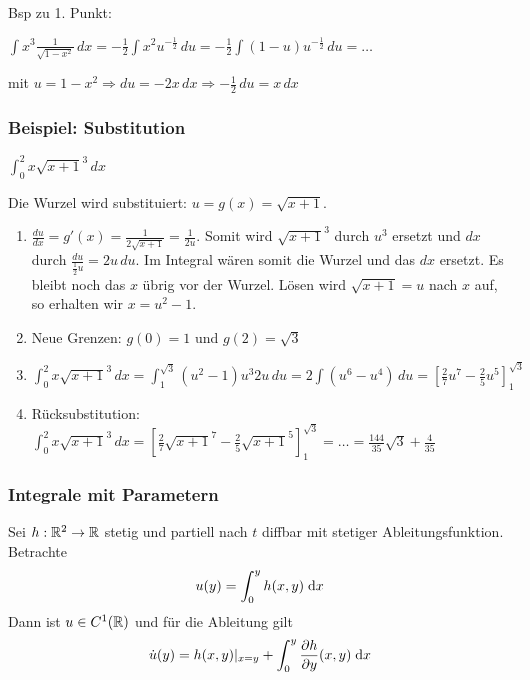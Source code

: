 Bsp zu 1. Punkt:

$\int x^3 \frac{1}{\sqrt{1-x^2}} \,dx = -\frac{1}{2} \int x^2 u^{-\frac{1}{2}} \,du 
= -\frac{1}{2} \int (1-u)u^{-\frac{1}{2}} \,du = \dots$

mit $u = 1-x^2 \Rightarrow du = -2x\,dx \Rightarrow -\frac{1}{2}\,du = x\,dx$

%

\subsubsection{Beispiel: Substitution}
$\int_0^2 x \sqrt{x+1}^3 \,dx$

Die Wurzel wird substituiert: $u = g(x) = \sqrt{x+1}$.

\begin{enumerate}[itemsep=0.5em]
	\item $\frac{du}{dx} = g'(x) = \frac{1}{2\sqrt{x+1}} = \frac{1}{2u}$. Somit
	wird $\sqrt{x+1}^3$ durch $u^3$ ersetzt und $dx$ durch
	$\frac{du}{\frac{1}{2}u} = 2u\,du$. Im Integral wären somit die Wurzel und das
	$dx$ ersetzt. Es bleibt noch das $x$ übrig vor der Wurzel. Lösen wird
	$\sqrt{x+1} = u$ nach $x$ auf, so erhalten wir $x = u^2 - 1$.
	\item Neue Grenzen: $g(0) = 1$ und $g(2) = \sqrt{3}$
	\item $\int_0^2 x \sqrt{x+1}^3 \,dx = \int_1^{\sqrt{3}} (u^2 - 1)u^3 2u \,du =
	2\int(u^6 -u^4) \,du = [\frac{2}{7}u^7 - \frac{2}{5}u^5]_{1}^{\sqrt{3}}$
	\item Rücksubstitution: $\int_0^2 x \sqrt{x+1}^3 \,dx =
	[\frac{2}{7}\sqrt{x+1}^7 - \frac{2}{5}\sqrt{x+1}^5]_{1}^{\sqrt{3}} = \ldots = \frac{144}{35}\sqrt{3} +
	\frac{4}{35}$
\end{enumerate}


\subsubsection{Integrale mit Parametern}
	Sei $h: \mathbb{R}^2 \to \mathbb{R}$ stetig und partiell nach $t$ diffbar mit stetiger Ableitungsfunktion. Betrachte 
	\[ u(y) = \int_0^y h(x,y) \; \mathrm{d} x \]
	Dann ist $u \in C^1(\mathbb{R})$ und für die Ableitung gilt
	\[ \dot{u}(y) = h(x,y)|_{x=y} + \int_0^y \frac{\partial h}{\partial y} (x,y) \; \mathrm{d} x \]